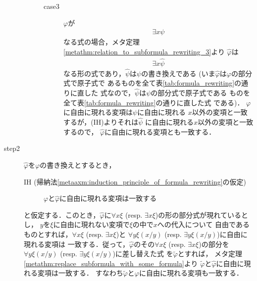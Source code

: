 \begin{metaprf}
\begin{description}
\begin{description}
\begin{description}
							\item[case3] $\varphi$が
								\begin{align}
									\exists x \psi
								\end{align}
								なる式の場合，メタ定理
								\ref{metathm:relation_to_subformula_rewriting_3}より
								$\widehat{\varphi}$は
								\begin{align}
									\exists x \widehat{\psi}
								\end{align}
								なる形の式であり，$\widehat{\psi}$は$\psi$の書き換えである
								(いま$\widehat{\varphi}$は$\varphi$の部分式で原子式で
								あるものを全て表\ref{tab:formula_rewriting}の通りに直した
								式なので，$\widehat{\psi}$は$\psi$の部分式で原子式である
								ものを全て表\ref{tab:formula_rewriting}の通りに直した式
								である)．
								$\varphi$に自由に現れる変項は$\psi$に自由に現れる
								$x$以外の変項と一致するが，(IH)よりそれは$\widehat{\psi}$
								に自由に現れる$x$以外の変項と一致するので，
								$\widehat{\varphi}$に自由に現れる変項とも一致する．
								\QED
						\end{description}
				\end{description}
			
			\item[step2]
				$\widehat{\varphi}$を$\varphi$の書き換えとするとき，
				\begin{description}
					\item[IH (帰納法\ref{metaaxm:induction_principle_of_formula_rewriting}の仮定)]
						$\varphi$と$\widehat{\varphi}$に自由に現れる変項は一致する
				\end{description}
				と仮定する．このとき，$\widehat{\varphi}$に$\forall x \xi$ 
				(resp. $\exists x \xi$)の形の部分式が現れているとし，
				$y$を$\xi$に自由に現れない変項で$\xi$の中で$x$への代入について
				自由であるものとすれば，$\forall x \xi$ (resp. $\exists x \xi$)と
				$\forall y \xi(x/y)$ (resp. $\exists y \xi(x/y)$)に自由に現れる変項は
				一致する．従って，$\widehat{\varphi}$のその$\forall x \xi$ 
				(resp. $\exists x \xi$)の部分を
				$\forall y \xi(x/y)$ (resp. $\exists y \xi(x/y)$)に差し替えた式
				を$\widetilde{\varphi}$とすれば，
				メタ定理\ref{metathm:replace_subformula_with_some_formula}より
				$\widetilde{\varphi}$と$\widehat{\varphi}$に自由に現れる変項は一致する．
				すなわち$\widetilde{\varphi}$と$\varphi$に自由に現れる変項も一致する．
				\QED
		\end{description}
	\end{metaprf}